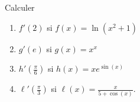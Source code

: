 \begin{exercice}\label{exo1}

Calculer
\begin{enumerate}

\item
$f'(2)$ si $f(x)=\ln(x^2+1)$
\item
$g'(e)$ si $g(x)=x^x$
\item
$h'(\frac{ \pi }{ 6 })$ si $h(x)=x e^{\sin(x)}$
\item
$\ell'(\frac{ \pi }{ 3 })$ si $\ell(x)=\frac{ x }{ 5+\cos(x) }$.

\end{enumerate}

\end{exercice}
